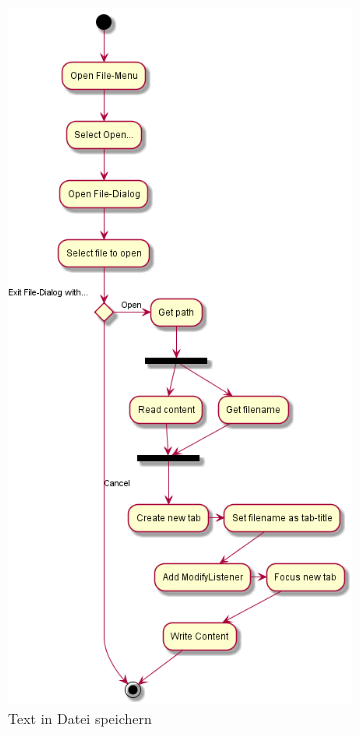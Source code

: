 \begin{figure}[H]
\begin{subfigure}[b]{0.45\linewidth}
        \includegraphics[width=\linewidth]{figures/open/open.png}
        \caption{Text in Datei speichern}
    \end{subfigure}
    \begin{subfigure}[b]{0.4\linewidth}
        

\end{subfigure}
\end{figure}
